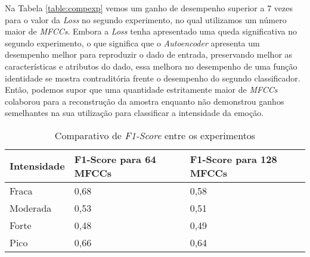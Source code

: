 Na Tabela \ref{table:compexp} vemos um ganho de desempenho superior a 7 vezes para o valor da \textit{Loss} no segundo experimento, no qual utilizamos um número maior de \textit{MFCCs}. Embora a \textit{Loss} tenha apresentado uma queda significativa no segundo experimento, o que significa que o \textit{Autoencoder} apresenta um desempenho melhor para reproduzir o dado de entrada, preservando melhor as características e atributos do dado, essa melhora no desempenho de uma função identidade se mostra contraditória frente o desempenho do segundo classificador. Então, podemos supor que uma quantidade estritamente maior de \textit{MFCCs} colaborou para a reconstrução da amostra enquanto não demonstrou ganhos semelhantes na sua utilização para classificar a intensidade da emoção.



\begin{table}[]
    \centering
    \begin{tabular}{|l|l|l|}
    \hline
        Intensidade & F1-Score para 64 MFCCs & F1-Score para 128 MFCCs \\ \hline
        Fraca & 0,68 & 0,58 \\ \hline
        Moderada & 0,53 & 0,51 \\ \hline
        Forte & 0,48 & 0,49 \\ \hline
        Pico & 0,66 & 0,64 \\ \hline
    \end{tabular}
     \caption{\label{table:resultexp}Comparativo de \textit{F1-Score} entre os experimentos}
\end{table}

